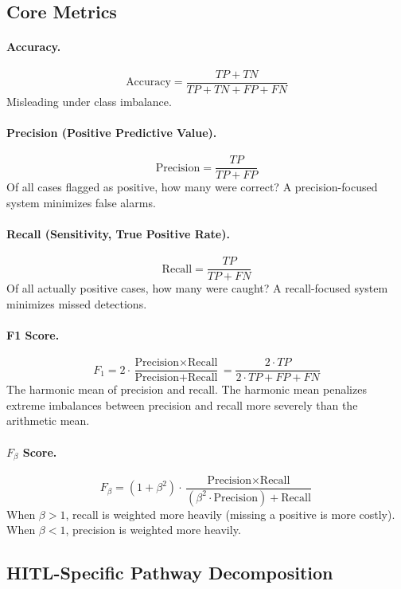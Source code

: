 \subsection{Core Metrics}

\paragraph{Accuracy.}
\[
\text{Accuracy} = \frac{TP + TN}{TP + TN + FP + FN}
\]
Misleading under class imbalance.

\paragraph{Precision (Positive Predictive Value).}
\[
\text{Precision} = \frac{TP}{TP + FP}
\]
Of all cases flagged as positive, how many were correct? A precision-focused system minimizes false alarms.

\paragraph{Recall (Sensitivity, True Positive Rate).}
\[
\text{Recall} = \frac{TP}{TP + FN}
\]
Of all actually positive cases, how many were caught? A recall-focused system minimizes missed detections.

\paragraph{F1 Score.}
\[
F_1 = 2 \cdot \frac{\text{Precision} \times \text{Recall}}{\text{Precision} + \text{Recall}} = \frac{2 \cdot TP}{2 \cdot TP + FP + FN}
\]
The harmonic mean of precision and recall. The harmonic mean penalizes extreme imbalances between precision and recall more severely than the arithmetic mean.

\paragraph{$F_\beta$ Score.}
\[
F_\beta = (1 + \beta^2) \cdot \frac{\text{Precision} \times \text{Recall}}{(\beta^2 \cdot \text{Precision}) + \text{Recall}}
\]
When $\beta > 1$, recall is weighted more heavily (missing a positive is more costly). When $\beta < 1$, precision is weighted more heavily.

\subsection{HITL-Specific Pathway Decomposition}

